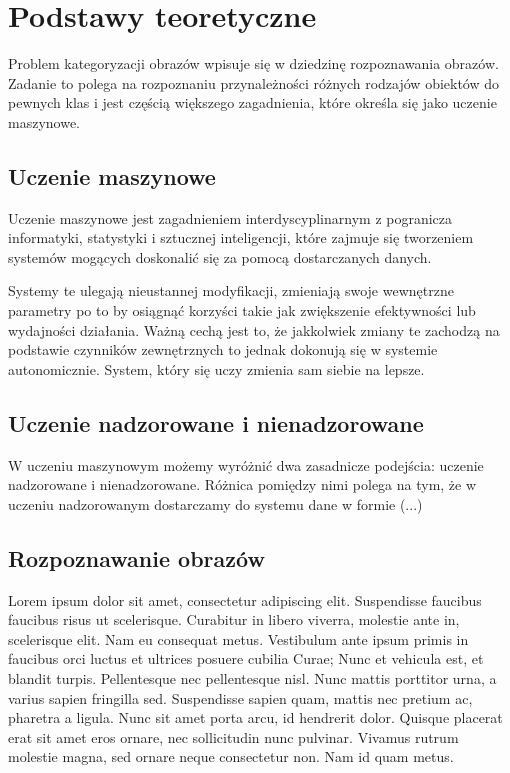 \chapter{Podstawy teoretyczne}

Problem kategoryzacji obrazów wpisuje się w dziedzinę rozpoznawania obrazów. Zadanie to polega na rozpoznaniu przynależności różnych rodzajów obiektów do pewnych klas\cite{Tad91} i jest częścią większego zagadnienia, które określa się jako uczenie maszynowe.

\section{Uczenie maszynowe}

Uczenie maszynowe jest zagadnieniem interdyscyplinarnym z pogranicza informatyki, statystyki i sztucznej inteligencji, które zajmuje się tworzeniem systemów mogących doskonalić się za pomocą dostarczanych danych. 

Systemy te ulegają nieustannej modyfikacji, zmieniają swoje wewnętrzne parametry po to by osiągnąć korzyści takie jak zwiększenie efektywności lub wydajności działania. Ważną cechą jest to, że jakkolwiek zmiany te zachodzą na podstawie czynników zewnętrznych to jednak dokonują się w systemie autonomicznie. System, który się uczy zmienia sam siebie na lepsze.\cite{CICHOSZ00}

\section{Uczenie nadzorowane i nienadzorowane}

W uczeniu maszynowym możemy wyróżnić dwa zasadnicze podejścia: uczenie nadzorowane i nienadzorowane. Różnica pomiędzy nimi polega na tym, że w uczeniu nadzorowanym dostarczamy do systemu dane w formie (...)


\section{Rozpoznawanie obrazów}
Lorem ipsum dolor sit amet, consectetur adipiscing elit. Suspendisse faucibus faucibus risus ut scelerisque. Curabitur in libero viverra, molestie ante in, scelerisque elit. Nam eu consequat metus. Vestibulum ante ipsum primis in faucibus orci luctus et ultrices posuere cubilia Curae; Nunc et vehicula est, et blandit turpis. Pellentesque nec pellentesque nisl. Nunc mattis porttitor urna, a varius sapien fringilla sed. Suspendisse sapien quam, mattis nec pretium ac, pharetra a ligula. Nunc sit amet porta arcu, id hendrerit dolor. Quisque placerat erat sit amet eros ornare, nec sollicitudin nunc pulvinar. Vivamus rutrum molestie magna, sed ornare neque consectetur non. Nam id quam metus.

